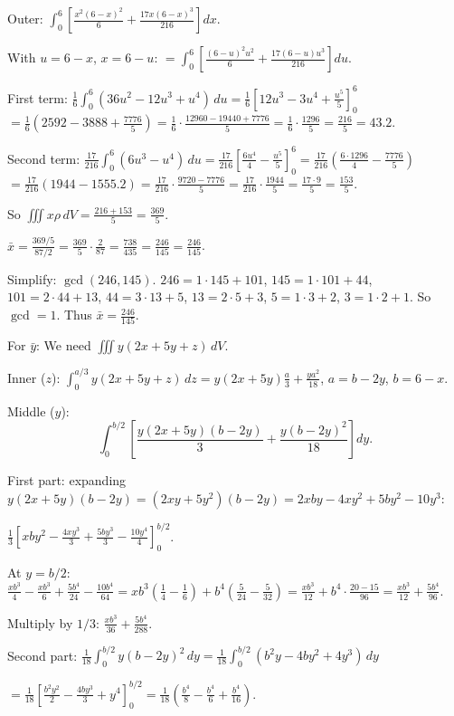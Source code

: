 \begin{enumerate}
\begin{enumerate}
Outer: $\int_0^6\left[\frac{x^2(6-x)^2}{6}+\frac{17x(6-x)^3}{216}\right]dx$.

With $u=6-x$, $x=6-u$:
$= \int_0^6\left[\frac{(6-u)^2 u^2}{6}+\frac{17(6-u)u^3}{216}\right]du$.

First term: $\frac{1}{6}\int_0^6(36u^2-12u^3+u^4)\,du = \frac{1}{6}\left[12u^3-3u^4+\frac{u^5}{5}\right]_0^6$
$= \frac{1}{6}\left(2592-3888+\frac{7776}{5}\right) = \frac{1}{6}\cdot\frac{12960-19440+7776}{5} = \frac{1}{6}\cdot\frac{1296}{5} = \frac{216}{5} = 43.2$.

Second term: $\frac{17}{216}\int_0^6(6u^3-u^4)\,du = \frac{17}{216}\left[\frac{6u^4}{4}-\frac{u^5}{5}\right]_0^6 = \frac{17}{216}\left(\frac{6\cdot 1296}{4}-\frac{7776}{5}\right)$
$= \frac{17}{216}\left(1944-1555.2\right) = \frac{17}{216}\cdot\frac{9720-7776}{5} = \frac{17}{216}\cdot\frac{1944}{5} = \frac{17\cdot 9}{5} = \frac{153}{5}$.

So $\iiint x\rho\,dV = \frac{216+153}{5} = \frac{369}{5}$.

$\bar{x} = \frac{369/5}{87/2} = \frac{369}{5}\cdot\frac{2}{87} = \frac{738}{435} = \frac{246}{145} = \frac{246}{145}$.

Simplify: $\gcd(246,145)$. $246 = 1\cdot 145+101$, $145=1\cdot 101+44$, $101=2\cdot 44+13$, $44=3\cdot 13+5$, $13=2\cdot 5+3$, $5=1\cdot 3+2$, $3=1\cdot 2+1$. So $\gcd=1$. Thus $\bar{x} = \frac{246}{145}$.

For $\bar{y}$: We need $\iiint y(2x+5y+z)\,dV$.

Inner ($z$): $\int_0^{a/3}y(2x+5y+z)\,dz = y(2x+5y)\frac{a}{3}+\frac{ya^2}{18}$, $a=b-2y$, $b=6-x$.

Middle ($y$):
\[
\int_0^{b/2}\left[\frac{y(2x+5y)(b-2y)}{3}+\frac{y(b-2y)^2}{18}\right]dy.
\]

First part: expanding $y(2x+5y)(b-2y) = (2xy+5y^2)(b-2y) = 2xby-4xy^2+5by^2-10y^3$:

$\frac{1}{3}\left[xby^2-\frac{4xy^3}{3}+\frac{5by^3}{3}-\frac{10y^4}{4}\right]_0^{b/2}$.

At $y=b/2$: $\frac{xb^3}{4}-\frac{xb^3}{6}+\frac{5b^4}{24}-\frac{10b^4}{64} = xb^3\left(\frac{1}{4}-\frac{1}{6}\right)+b^4\left(\frac{5}{24}-\frac{5}{32}\right) = \frac{xb^3}{12}+b^4\cdot\frac{20-15}{96} = \frac{xb^3}{12}+\frac{5b^4}{96}$.

Multiply by $1/3$: $\frac{xb^3}{36}+\frac{5b^4}{288}$.

Second part: $\frac{1}{18}\int_0^{b/2}y(b-2y)^2\,dy = \frac{1}{18}\int_0^{b/2}(b^2 y-4by^2+4y^3)\,dy$

$= \frac{1}{18}\left[\frac{b^2 y^2}{2}-\frac{4by^3}{3}+y^4\right]_0^{b/2} = \frac{1}{18}\left(\frac{b^4}{8}-\frac{b^4}{6}+\frac{b^4}{16}\right)$.


\end{enumerate}
\end{enumerate}
